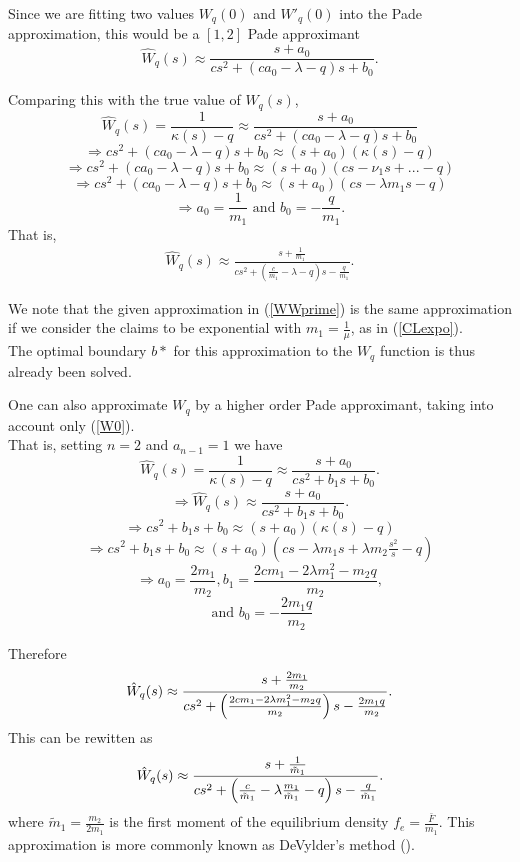 Since we are fitting two values $W_q(0)$ and $W'_q(0)$ into the Pade approximation, this would be a $[1,2]$ Pade approximant
\[
\hat{W}_q(s) \approx \frac{s + a_0}{cs^2 + (c a_0 -\lambda - q) s +b_0}.
\]

Comparing this with the true value of $\hat{W}_q(s)$,
\[
\hat{W}_q(s) = \frac{1}{\kappa(s)-q} \approx \frac{s + a_0}{cs^2 + (c a_0 -\lambda - q) s +b_0}
\]
\[
\Rightarrow cs^2 +(c a_0 -\lambda - q) s +b_0 \approx (s + a_0)(\kappa(s)-q)
\]
\[
\Rightarrow cs^2 +(c a_0 -\lambda - q) s +b_0 \approx (s + a_0)(cs -\nu_1 s +... -q)
\]
\[
\Rightarrow cs^2 +(c a_0 -\lambda - q) s +b_0 \approx (s + a_0)(cs -\lambda m_1 s  -q)
\]
\[
\Rightarrow a_0 = \frac{1}{m_1} \text{ and } b_0 = -\frac{q}{m_1}.
\]
That is,
\begin{align}
\label{WWprime}
\hat{W}_q(s) \approx \frac{s +  \frac{1}{m_1}}{cs^2 + ( \frac{c}{m_1} -\lambda - q) s -\frac{q}{m_1}}.
\end{align}

We note that the given approximation in (\ref{WWprime}) is the same approximation if we consider the claims to be exponential with $m_1 = \frac{1}{\mu}$, as in (\ref{CLexpo}).\\
\bigskip
The optimal boundary $b*$ for this approximation to the $W_q$ function is thus already been solved.

One can also approximate $W_q$ by a higher order Pade approximant, taking into account only (\ref{W0}).\\
That is, setting $n=2$ and $a_{n-1} = 1$ we have
\[
\hat{W}_q(s) = \frac{1}{\kappa(s)-q} \approx \frac{s + a_0}{cs^2 + b_1 s + b_0}.
\]
\[
\Rightarrow \hat{W}_q(s) \approx \frac{s + a_0}{cs^2 + b_1 s + b_0}.
\]
\[
\Rightarrow cs^2 +b_1 s +b_0 \approx (s + a_0)(\kappa(s)-q)
\]
\[
\Rightarrow cs^2 +b_1 s +b_0 \approx (s + a_0)(cs - \lambda m_1 s + \lambda m_2 \tfrac{s^2}{s} - q)
\]
\[
\Rightarrow a_0 = \frac{2m_1}{m_2}, b_1 = \frac{2c m_1 - 2\lambda m_1^2 - m_2 q}{m_2},
\]
\[
\text{ and } b_0 = -\frac{2m_1 q}{m_2}
\]

Therefore
\[
\hat{W}_q(s) \approx \frac{s +\frac{2m_1}{m_2}}{cs^2 + \left( \frac{2c m_1 - 2\lambda m_1^2 - m_2 q}{m_2} \right) s -\frac{2m_1 q}{m_2}}.
\]
This can be rewitten as
\[
\hat{W}_q(s) \approx \frac{s +\frac{1}{\tilde {m}_1}}{cs^2 + \left( \frac{c}{\tilde{m}_1} - \lambda \frac{m_1}{\tilde{m}_1} -q \right) s -\frac{q}{\tilde {m}_1}}.
\]
where $\tilde{m}_1 = \frac{m_2}{2m_1}$ is the first moment of the equilibrium density $f_e = \frac{\bar{F}}{m_1}$. This approximation is more commonly known as DeVylder's method (\cite{gerber2008methods}).


